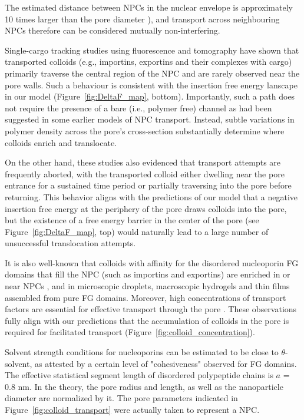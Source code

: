 \documentclass[12pt, a4paper]{article}
\begin{document}
The estimated distance between NPCs in the nuclear envelope is approximately 10 times larger than the pore diameter \cite{Yang2004, Daigle2001, Feldherr1984, Kubitscheck2000}), and transport across neighbouring NPCs therefore can be considered mutually non-interfering. 

Single-cargo tracking studies using fluorescence \cite{Musser2016, Lowe2010, Lowe2015, Yang2004, Kubitscheck2000, Ma2010} and tomography \cite{Beck2007} have shown that transported colloids (e.g., importins, exportins and their complexes with cargo) primarily traverse the central region of the NPC and are rarely observed near the pore walls.
Such a behaviour is consistent with the  insertion free energy lanscape in our model (Figure~\ref{fig:DeltaF_map}, bottom).
Importantly, such a path does not require the presence of a bare (i.e., polymer free) channel as had been suggested in some earlier models of NPC transport. Instead, subtle variations in polymer density across the pore's cross-section substantially determine where colloids enrich and translocate.  

On the other hand, these studies also evidenced that transport attempts are frequently aborted, with the transported colloid either dwelling near the pore entrance for a sustained time period or partially traversing into the pore before returning.
This behavior aligns with the predictions of our model that a negative insertion free energy at the periphery of the pore draws colloids into the pore, but the existence of a free energy barrier in the center of the pore (see Figure~\ref{fig:DeltaF_map}, top) would naturally lead to a large number of unsuccessful translocation attempts.

It is also well-known that colloids with affinity for the disordered nucleoporin FG domains that fill the NPC (such as importins and exportins) are enriched in or near NPCs \cite{Beck2007, Gruenwald2010, Tu2011}, and in microscopic droplets, macroscopic hydrogels and thin films assembled from pure FG domains.
Moreover, high concentrations of transport factors are essential for effective transport through the pore \cite{Lowe2015}.
These observations fully align with our predictions that the accumulation of colloids in the pore is required for facilitated transport (Figure~\ref{fig:colloid_concentration}).

Solvent strength conditions for nucleoporins can be estimated to be close to $\theta$-solvent, as attested by a certain level of "cohesiveness" observed for FG domains. 
The effective statistical segment length of disordered polypeptide chains is $a$ = 0.8 nm. In the theory, the pore radius and length, as well as the nanoparticle diameter are normalized by it. The pore parameters indicated in Figure~\ref{fig:colloid_transport} were actually taken to represent a NPC.
\end{document}
